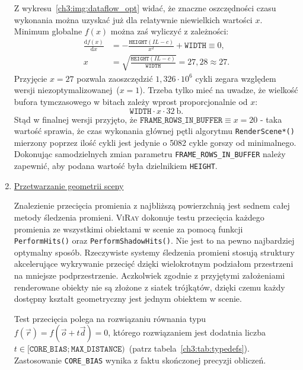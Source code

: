 \begin{enumerate}
Z wykresu~\ref{ch3:img:dataflow_opt} widać, że znaczne oszczędności czasu wykonania można uzyskać już dla relatywnie niewielkich wartości $x$. Minimum globalne $f(x)$ można zaś wyliczyć z zależności:
\begin{align*}
\frac{\mathrm{d}f(x)}{\mathrm{d}x} &= -\frac{\mathtt{HEIGHT}\left(IL - c \right)}{x^2} + \mathtt{WIDTH} \equiv 0,\\
x &= \sqrt{\frac{\mathtt{HEIGHT}\left(IL - c \right)}{\mathtt{WIDTH}}} = 27,28\approx 27.
\end{align*}
Przyjęcie $x=27$ pozwala zaoszczędzić $1,326\cdot 10^6$ cykli zegara względem wersji niezoptymalizowanej~($x=1$). Trzeba tylko mieć na uwadze, że wielkość bufora tymczasowego w bitach zależy wprost proporcjonalnie od $x$: 
\begin{equation}
\mathtt{WIDTH}\cdot x \cdot 32\ \mathrm{b}.
\end{equation}
Stąd w finalnej wersji przyjęto, że $\mathtt{FRAME\_ROWS\_IN\_BUFFER}\equiv x = 20$ - taka wartość sprawia, że czas wykonania głównej pętli algorytmu \texttt{RenderScene*()} mierzony poprzez ilość cykli jest jedynie o {\color{red}5082} cykle gorszy od minimalnego. Dokonując samodzielnych zmian parametru \texttt{FRAME\_ROWS\_IN\_BUFFER} należy zapewnić, aby podana wartość była dzielnikiem \texttt{HEIGHT}.


\item \underline{Przetwarzanie geometrii sceny}

Znalezienie przecięcia promienia z najbliższą  powierzchnią jest sednem całej metody śledzenia promieni. \textsc{ViRay} dokonuje testu przecięcia każdego promienia ze wszystkimi obiektami w scenie za pomocą funkcji \texttt{PerformHits()} oraz \texttt{PerformShadowHits()}. Nie jest to na pewno najbardziej optymalny sposób. Rzeczywiste systemy śledzenia promieni stosują struktury akcelerujące wykrywanie przecięć dzięki wielokrotnym podziałom przestrzeni na mniejsze podprzestrzenie. Aczkolwiek zgodnie z przyjętymi założeniami renderowane obiekty nie są złożone z siatek trójkątów, dzięki czemu każdy dostępny kształt geometryczny jest jednym obiektem w scenie. 

Test przecięcia polega na rozwiązaniu równania typu $f(\vec{r}) = f(\vec{o} + t\vec{d})= 0$, którego rozwiązaniem jest dodatnia liczba $t \in [\mathtt{CORE\_BIAS};\mathtt{MAX\_DISTANCE})$~(patrz tabela~\ref{ch3:tab:typedefs}). Zastosowanie \texttt{CORE\_BIAS} wynika z faktu skończonej precyzji obliczeń.


\end{enumerate}
